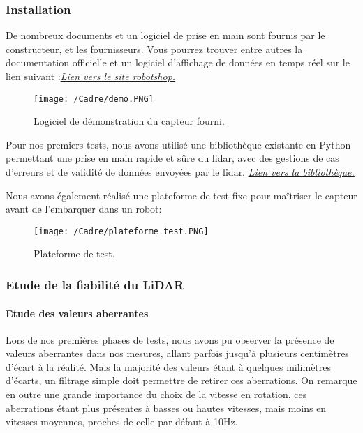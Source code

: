 \subsubsection{Installation}
\tab De nombreux documents et un logiciel de prise en main sont fournis par le constructeur, et les fournisseurs. Vous pourrez trouver entre autres la documentation officielle et un logiciel d’affichage de données en temps réel sur le lien suivant :\newline \href{https://www.robotshop.com/en/rplidar-a2-360-laser-scanner.html}{\textit{Lien vers le site robotshop.}}

\begin{figure}[htp]
    \centering
    \texttt{[image: /Cadre/demo.PNG]}
    \caption{Logiciel de démonstration du capteur fourni.}
\end{figure}

Pour nos premiers tests, nous avons utilisé une bibliothèque existante en Python permettant une prise en main rapide et sûre du lidar, avec des gestions de cas d’erreurs et de validité de données envoyées par le lidar.
\href{https://github.com/Roboticia/RPLidar}{\textit{Lien vers la bibliothèque.}}


Nous avons également réalisé une plateforme de test fixe pour maîtriser le capteur avant de l’embarquer dans un robot:

\begin{figure}[htp]
    \centering
    \texttt{[image: /Cadre/plateforme\_test.PNG]}
    \caption{Plateforme de test.}
\end{figure}

\subsubsection{Etude de la fiabilité du LiDAR}
\paragraph{Etude des valeurs aberrantes}
\tab Lors de nos premières phases de tests, nous avons pu observer la présence de valeurs aberrantes dans nos mesures, allant parfois jusqu'à plusieurs centimètres d'écart à la réalité. Mais la majorité des valeurs étant à quelques milimètres d'écarts, un filtrage simple doit permettre de retirer ces aberrations.
On remarque en outre une grande importance du choix de la vitesse en rotation, ces aberrations étant plus présentes à basses ou hautes vitesses, mais moins en vitesses moyennes, proches de celle par défaut à 10Hz.

